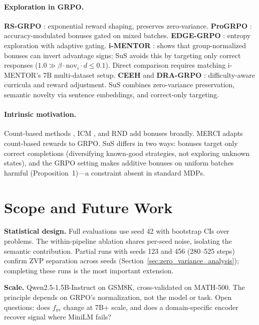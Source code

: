 \documentclass[10pt]{article}
\begin{document}
\paragraph{Exploration in GRPO.}
\textbf{RS-GRPO} \citep{yu2025rsgrpo}: exponential reward shaping, preserves zero-variance.
\textbf{ProGRPO} \citep{cui2025progrpo}: accuracy-modulated bonuses gated on mixed batches.
\textbf{EDGE-GRPO} \citep{zhao2025edgegrpo}: entropy exploration with adaptive gating.
\textbf{i-MENTOR} \citep{wang2025imentor}: shows that group-normalized bonuses can invert advantage signs; SuS avoids this by targeting only correct responses ($1.0 \gg \beta \cdot \text{nov}_i \cdot d \leq 0.1$). Direct comparison requires matching i-MENTOR's 7B multi-dataset setup.
\textbf{CEEH} \citep{li2026ceeh} and \textbf{DRA-GRPO} \citep{zhang2025dragrpo}: difficulty-aware curricula and reward adjustment.
SuS combines zero-variance preservation, semantic novelty via sentence embeddings, and correct-only targeting.

\paragraph{Intrinsic motivation.}
Count-based methods \citep{bellemare2016unifying}, ICM \citep{pathak2017curiosity}, and RND \citep{burda2018exploration} add bonuses broadly. MERCI \citep{li2025merci} adapts count-based rewards to GRPO. SuS differs in two ways: bonuses target only correct completions (diversifying known-good strategies, not exploring unknown states), and the GRPO setting makes additive bonuses on uniform batches harmful (Proposition~1)---a constraint absent in standard MDPs.

\section{Scope and Future Work}
\label{sec:limitations}

\textbf{Statistical design.} Full evaluations use seed 42 with bootstrap CIs over problems. The within-pipeline ablation shares per-seed noise, isolating the semantic contribution. Partial runs with seeds 123 and 456 (280--525 steps) confirm ZVP separation across seeds (Section~\ref{sec:zero_variance_analysis}); completing these runs is the most important extension.

\textbf{Scale.} Qwen2.5-1.5B-Instruct on GSM8K, cross-validated on MATH-500. The principle depends on GRPO's normalization, not the model or task. Open questions: does $f_{\text{zv}}$ change at 7B+ scale, and does a domain-specific encoder recover signal where MiniLM fails?
\end{document}

